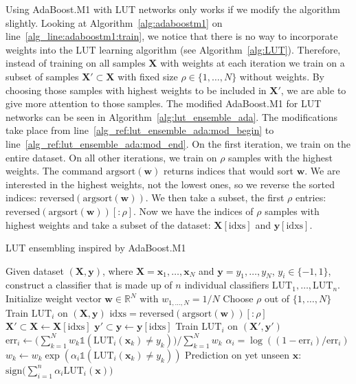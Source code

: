 Using AdaBoost.M1 with LUT networks only works if we modify the algorithm slightly. Looking at Algorithm~\ref{alg:adaboostm1} on line~\ref{alg_line:adaboostm1:train}, we notice that there is no way to incorporate weights into the LUT learning algorithm (see Algorithm~\ref{alg:LUT}). Therefore, instead of training on all samples $\bm{X}$ with weights at each iteration we train on a subset of samples $\bm{X}' \subset \bm{X}$ with fixed size $\rho \in \{1, \dots, N\}$ without weights. By choosing those samples with highest weights to be included in $\bm{X}'$, we are able to give more attention to those samples. The modified AdaBoost.M1 for LUT networks can be seen in Algorithm~\ref{alg:lut_ensemble_ada}. The modifications take place from line~\ref{alg_ref:lut_ensemble_ada:mod_begin} to line~\ref{alg_ref:lut_ensemble_ada:mod_end}. On the first iteration, we train on the entire dataset. On all other iterations, we train on $\rho$ samples with the highest weights. The command $\text{argsort}(\bm{w})$ returns indices that would sort $\bm{w}$. We are interested in the highest weights, not the lowest ones, so we reverse the sorted indices: $\text{reversed}(\text{argsort}(\bm{w}))$. We then take a subset, the first $\rho$ entries: $\text{reversed}(\text{argsort}(\bm{w}))[:\rho]$. Now we have the indices of $\rho$ samples with highest weights and take a subset of the dataset: $\bm{X}[\text{idxs}]$ and $\bm{y}[\text{idxs}]$.

\begin{algorithm}
  \caption{LUT ensembling inspired by AdaBoost.M1}\label{alg:lut_ensemble_ada}
  \begin{algorithmic}[1]
    \State Given dataset $(\bm{X}, \bm{y})$, where $\bm{X} = \bm{x}_1, \dots, \bm{x}_N$ and $\bm{y} = y_1, \dots, y_N$, $y_i \in \{-1, 1\}$, construct a classifier that is made up of $n$ individual classifiers $\text{LUT}_1, \dots, \text{LUT}_n$.
    \vspace{1em}
    \State Initialize weight vector $\bm{w} \in \mathds{R}^N$ with $w_{1, \dots, N} = 1/N$
    \State Choose $\rho$ out of $\{1, \dots, N\}$
    \vspace{0.5em}
     \label{alg_ref:lut_ensemble_ada:mod_begin}
      \State Train $\text{LUT}_i$ on $(\bm{X},\bm{y})$
    \Else
    \State $\text{idxs} = \text{reversed}(\text{argsort}(\bm{w}))[:\rho]$
    \State $\bm{X}' \subset \bm{X} \gets \bm{X}[\text{idxs}]$
    \State $\bm{y}' \subset \bm{y} \gets \bm{y}[\text{idxs}]$
      \State Train $\text{LUT}_i$ on $(\bm{X}', \bm{y}')$
      \EndIf \label{alg_ref:lut_ensemble_ada:mod_end}
    \State $\text{err}_i \gets \big( \sum_{k=1}^N w_k \mathbb{1}(\text{LUT}_i(\bm{x}_k) \neq y_k) \big) / \sum_{k=1}^N w_k$
    \State $\alpha_i = \log((1 - \text{err}_i) / \text{err}_i)$
    \State $w_k \gets w_k \exp(\alpha_i \mathbb{1}(\text{LUT}_i(\bm{x}_k) \neq y_k))$
    \EndFor
    \EndFor
    \State Prediction on yet unseen $\bm{x}$: $\text{sign} \big( \sum_{i = 1}^n \alpha_i \text{LUT}_i(\bm{x}) \big)$
  \end{algorithmic}
\end{algorithm}
\FloatBarrier

